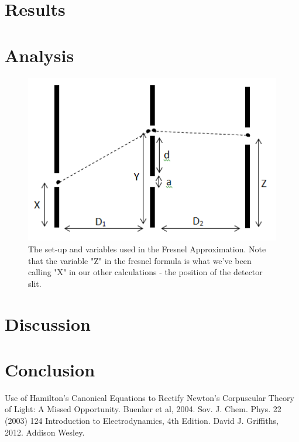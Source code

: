 \documentclass[prb,preprint]{revtex4-1}
\begin{document}
\section{Results}



\section{Analysis}

\begin{figure}[h!]
\centering
\includegraphics[width=6in]{fresnel_diagram.png}
\caption{The set-up and variables used in the Fresnel Approximation. Note that the variable "Z" in the fresnel formula is what we've been calling "X" in our other calculations - the position of the detector slit.}
\label{fresnel_diagram}
\end{figure}

\section{Discussion}

\section{Conclusion}

 
\begin{thebibliography}{3}
 Use of Hamilton's Canonical Equations to Rectify Newton's Corpuscular Theory of Light:  A Missed Opportunity.  Buenker et al, 2004.  Sov. J. Chem. Phys. 22 (2003) 124
 Introduction to Electrodynamics, 4th Edition.  David J. Griffiths, 2012.  Addison Wesley.

\end{thebibliography}
\end{document}
